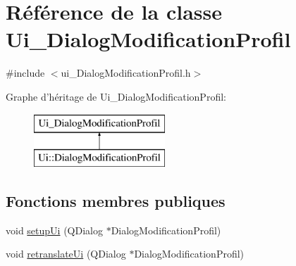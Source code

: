 \hypertarget{class_ui___dialog_modification_profil}{\section{Référence de la classe Ui\-\_\-\-Dialog\-Modification\-Profil}
\label{class_ui___dialog_modification_profil}
}


{\ttfamily \#include $<$ui\-\_\-\-Dialog\-Modification\-Profil.\-h$>$}

Graphe d'héritage de Ui\-\_\-\-Dialog\-Modification\-Profil\-:\begin{figure}[H]
\begin{center}
\leavevmode
\includegraphics[height=2.000000cm]{class_ui___dialog_modification_profil}
\end{center}
\end{figure}
\subsection*{Fonctions membres publiques}
\begin{DoxyCompactItemize}
\item 
void \hyperlink{class_ui___dialog_modification_profil_a48769dc430bb027d7b0b6df4bcd7146b}{setup\-Ui} (Q\-Dialog $\ast$Dialog\-Modification\-Profil)
\item 
void \hyperlink{class_ui___dialog_modification_profil_aaa740d7d565aabc709ec9b4e5ca46568}{retranslate\-Ui} (Q\-Dialog $\ast$Dialog\-Modification\-Profil)
\end{DoxyCompactItemize}
